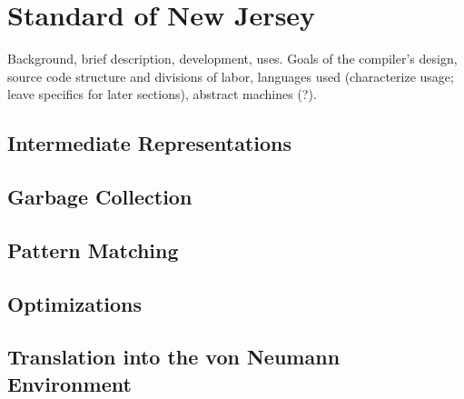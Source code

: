 \section{Standard  of New Jersey}\label{functional:smlnj}
Background, brief description, development, uses. Goals of the compiler's design, source code structure and divisions of labor, languages used (characterize usage; leave specifics for later sections), abstract machines (?).

\subsection{Intermediate Representations}

\subsection{Garbage Collection}

\subsection{Pattern Matching}

\subsection{Optimizations}

\subsection{Translation into the von Neumann Environment}
